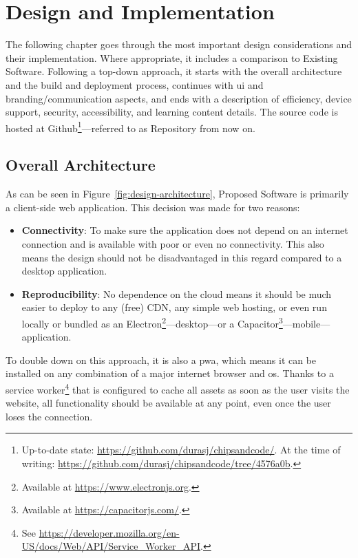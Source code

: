 \chapter{Design and Implementation}
\label{Design-Implementation}

The following chapter goes through the most important design considerations and their implementation.
Where appropriate, it includes a comparison to Existing Software.
Following a top-down approach, it starts with the overall architecture and the build and deployment process, continues with \gls{ui} and branding/communication aspects, and ends with a description of efficiency, device support, security, accessibility, and learning content details.
The source code is hosted at Github\footnote{Up-to-date state: \url{https://github.com/durasj/chipsandcode/}. At the time of writing: \url{https://github.com/durasj/chipsandcode/tree/4576a0b}.}---referred to as Repository from now on.

\section{Overall Architecture}
\label{sec:architecture}

As can be seen in Figure~\ref{fig:design-architecture}, Proposed Software is primarily a client-side web application.
This decision was made for two reasons:

\begin{itemize}
    \item \textbf{Connectivity}: To make sure the application does not depend on an internet connection and is available with poor or even no connectivity. This also means the design should not be disadvantaged in this regard compared to a desktop application.
    \item \textbf{Reproducibility}: No dependence on the cloud means it should be much easier to deploy to any (free) CDN, any simple web hosting, or even run locally or bundled as an Electron\footnote{Available at \url{https://www.electronjs.org}.}---desktop---or a Capacitor\footnote{Available at \url{https://capacitorjs.com/}.}---mobile---application.
\end{itemize}

To double down on this approach, it is also a \gls{pwa}, which means it can be installed on any combination of a major internet browser and \gls{os}.
Thanks to a service worker\footnote{See \url{https://developer.mozilla.org/en-US/docs/Web/API/Service_Worker_API}.} that is configured to cache all assets as soon as the user visits the website, all functionality should be available at any point, even once the user loses the connection.


